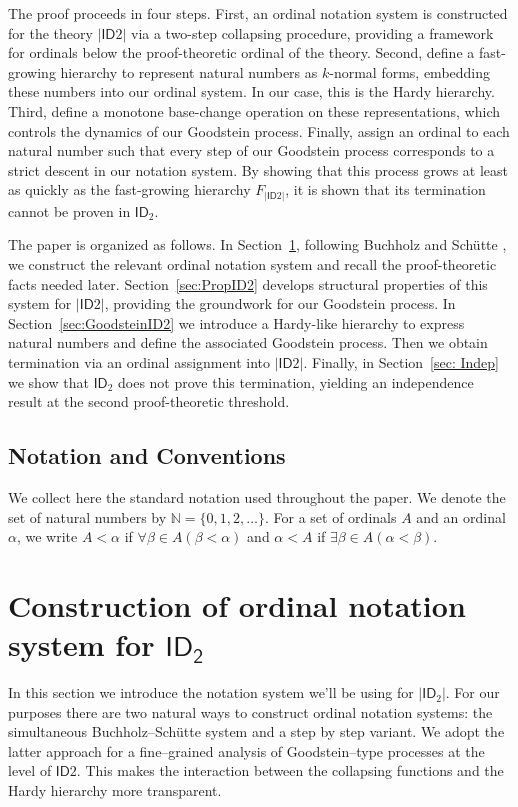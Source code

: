 \documentclass{amsart}
\theoremstyle{plain}
\theoremstyle{plain}
\newcommand{\ID}{\mathsf{ID}}
\newcommand{\al}{{\alpha}}
\newcommand{\be}{{\beta}}
\newcommand\Nat{\mathbb{N}}
\begin{document}
The proof proceeds in four steps.
First, an ordinal notation system is constructed for the theory $|\ID2|$ via a two-step collapsing procedure, providing a framework for ordinals below the proof-theoretic ordinal of the theory.
Second, define a fast-growing hierarchy to represent natural numbers as $k$-normal forms, embedding these numbers into our ordinal system. In our case, this is the Hardy hierarchy. 
Third, define a monotone base-change operation on these representations, which controls the dynamics of our Goodstein process. 
Finally, assign an ordinal to each natural number such that every step of our Goodstein process corresponds to a strict descent in our notation system. By showing that this process grows at least as quickly as the fast-growing hierarchy $F_{|\ID2|}$, it is shown that its termination cannot be proven in $\ID_2$.\smallskip
 
The paper is organized as follows.
In Section~\ref{sec: PrelimID2}, following Buchholz and Sch\"utte \cite{BuchholzSchutte}, we construct the relevant ordinal notation system and recall the proof-theoretic facts needed later. 
Section~\ref{sec:PropID2} develops structural properties of this system for $|\ID2|$, providing the groundwork for our Goodstein process. 
In Section~\ref{sec:GoodsteinID2} we introduce a Hardy-like hierarchy to express natural numbers and define the associated Goodstein process. Then we obtain termination via an ordinal assignment into $|\ID2|$. 
Finally, in Section~\ref{sec: Indep} we show that $\ID_2$ does not prove this termination, yielding an independence result at the second proof-theoretic threshold.

\subsection{Notation and Conventions}

We collect here the standard notation used throughout the paper. We denote the set of natural numbers by $\Nat = \{0, 1, 2, \dots\}$. 
For a set of ordinals $A$ and an ordinal $\al$, we write $A < \al$ if $\forall\be \in A(\be < \al)$ and $\al < A$ if $\exists\be \in A(\al < \be)$.



\section{Construction of ordinal notation system for \texorpdfstring{$\mathsf{ID_2}$}{ID2}}
\label{sec: PrelimID2}
In this section we introduce the notation system we'll be using for $|\ID_2|$. 
For our purposes there are two natural ways to construct ordinal notation systems: the simultaneous Buchholz–Sch\"utte system \cite{BuchholzSchutte} and a step by step variant. We adopt the latter approach for a fine–grained analysis of Goodstein–type processes at the level of $\ID2$. This makes the interaction between the collapsing functions and the Hardy hierarchy more transparent.
\end{document}
